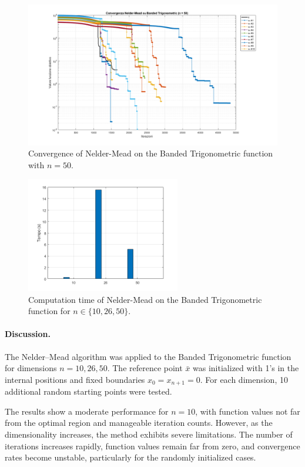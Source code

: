 \documentclass[a4paper,12pt]{article}
\begin{document}
	\begin{figure}[htbp]
		\centering
		\includegraphics[width=\textwidth]{../immagini/banded_50.png}
		\caption{Convergence of Nelder-Mead on the Banded Trigonometric function with $n = 50$.}
		\label{fig:bt_nelder_50}
	\end{figure}
	
	\begin{figure}[htbp]
		\centering
		\includegraphics[width=0.6\textwidth]{../immagini/banded_time_nelder.png}
		\caption{Computation time of Nelder-Mead on the Banded Trigonometric function for $n \in \{10, 26, 50\}$.}
		\label{fig:bt_nelder_time}
	\end{figure}
	
	\paragraph{Discussion.}
	The Nelder–Mead algorithm was applied to the Banded Trigonometric function for dimensions $n = 10, 26, 50$. The reference point $\bar{x}$ was initialized with 1's in the internal positions and fixed boundaries $x_0 = x_{n+1} = 0$. For each dimension, 10 additional random starting points were tested.
	
	The results show a moderate performance for $n=10$, with function values not far from the optimal region and manageable iteration counts. However, as the dimensionality increases, the method exhibits severe limitations. The number of iterations increases rapidly, function values remain far from zero, and convergence rates become unstable, particularly for the randomly initialized cases.
	
\end{document}

